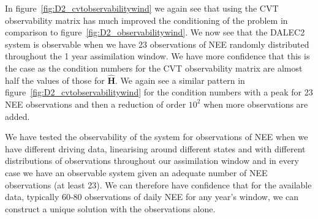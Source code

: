 \documentclass[11pt]{article}
\begin{document}
In figure~\ref{fig:D2_cvtobservabilitywind} we again see that using the CVT observability matrix has much improved the conditioning of the problem in comparison to figure~\ref{fig:D2_observabilitywind}. We now see that the DALEC2 system is observable when we have 23 observations of NEE randomly distributed throughout the 1 year assimilation window. We have more confidence that this is the case as the condition numbers for the CVT observability matrix are almost half the values of those for $\hat{\textbf{H}}$. We again see a similar pattern in figure~\ref{fig:D2_cvtobservabilitywind} for the condition numbers with a peak for 23 NEE observations and then a reduction of order $10^{2}$ when more observations are added. 

We have tested the observability of the system for observations of NEE when we have different driving data, linearising around different states and with different distributions of observations throughout our assimilation window and in every case we have an observable system given an adequate number of NEE observations (at least 23). We can therefore have confidence that for the available data, typically 60-80 observations of daily NEE for any year's window, we can construct a unique solution with the observations alone.
\end{document}
